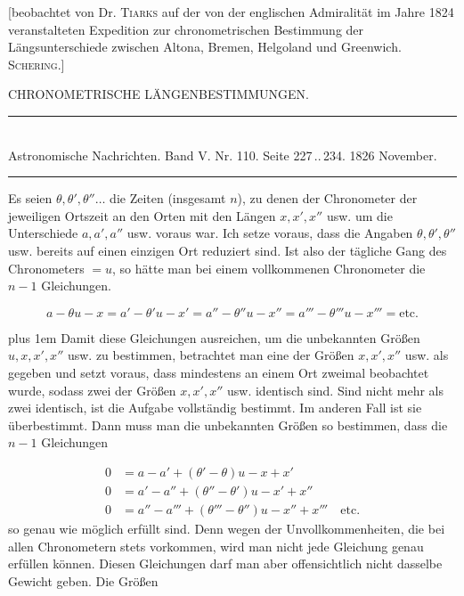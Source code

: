 \clearpage
{}
\hypertarget{native-460-chronometric}{}
\expandafter\def\csname HistoricalNoteText462\endcsname{[beobachtet von Dr. \textsc{Tiarks} auf der von der englischen Admiralität im Jahre 1824
veranstalteten Expedition zur chronometrischen Bestimmung der Längsunterschiede zwischen Altona,
Bremen, Helgoland und Greenwich. \textsc{Schering}.]}
\begin{center}{\large CHRONOMETRISCHE LÄNGENBESTIMMUNGEN.}\end{center}

\begin{center}
\rule{0.55\linewidth}{0.4pt}\\[2pt]
Astronomische Nachrichten. Band V. Nr. 110. Seite 227\,..\,234. 1826 November.\\[2pt]
\rule{0.55\linewidth}{0.4pt}
\end{center}

Es seien $\theta, \theta', \theta''\ldots$ die Zeiten (insgesamt $n$), zu denen der Chronometer der jeweiligen Ortszeit an den Orten mit den Längen $x, x', x''$ usw. um die Unterschiede $a, a', a''$ usw. voraus war. Ich setze voraus, dass die Angaben $\theta, \theta', \theta''$ usw. bereits auf einen einzigen Ort reduziert sind. Ist also der tägliche Gang des Chronometers $=u$, so hätte man bei einem vollkommenen Chronometer die $n-1$ Gleichungen.

\[
a-\theta u-x = a'-\theta' u-x' = a''-\theta'' u-x'' = a'''-\theta''' u-x''' = \text{etc.}
\]

\begingroup\rightskip=0pt plus 1em
Damit diese Gleichungen ausreichen, um die unbekannten Größen $u, x, x', x''$ usw. zu bestimmen, betrachtet man eine der Größen $x, x', x''$ usw. als gegeben und setzt voraus, dass mindestens an einem Ort zweimal beobachtet wurde, sodass zwei der Größen $x, x', x''$ usw. identisch sind. Sind nicht mehr als zwei identisch, ist die Aufgabe vollständig bestimmt. Im anderen Fall ist sie überbestimmt. Dann muss man die unbekannten Größen so bestimmen, dass die $n-1$ Gleichungen\par\endgroup

\[
\begin{aligned}
0 &= a-a'+(\theta'-\theta)u-x+x'\\
0 &= a'-a''+(\theta''-\theta')u-x'+x''\\
0 &= a''-a'''+(\theta'''-\theta'')u-x''+x''' \quad \text{etc.}
\end{aligned}
\]
\noindent so genau wie möglich erfüllt sind. Denn wegen der Unvollkommenheiten, die bei allen Chronometern stets vorkommen, wird man nicht jede Gleichung genau erfüllen können. Diesen Gleichungen darf man aber offensichtlich nicht dasselbe Gewicht geben. Die Größen

